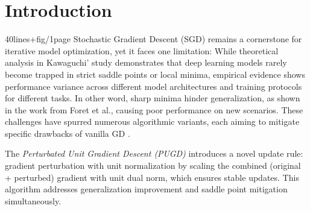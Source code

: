 \documentclass[10pt,twocolumn,letterpaper]{article}
\begin{document}
\section{Introduction} 40lines+fig/1page
Stochastic Gradient Descent (SGD) \cite{4308316} remains a cornerstone for iterative model optimization, yet it faces one limitation: While theoretical analysis in Kawaguchi' study \cite{kawaguchi2016deeplearningpoorlocal} demonstrates that deep learning models rarely become trapped in strict saddle points or local minima, empirical evidence shows performance variance across different model architectures and training protocols for different tasks. In other word, sharp minima hinder generalization, as shown in the work from Foret et al.\cite{foret2021sharpnessawareminimizationefficientlyimproving}, causing poor performance on new scenarios. These challenges have spurred numerous algorithmic variants, each aiming to mitigate specific drawbacks of vanilla GD \cite{ruder2017overviewgradientdescentoptimization}.

The \textit{Perturbated Unit Gradient Descent (PUGD)} \cite{Tseng_2022} introduces a novel update rule: gradient perturbation with unit normalization by scaling the combined (original + perturbed) gradient with unit dual norm, which ensures stable updates. This algorithm addresses generalization improvement and saddle point mitigation simultaneously.
\end{document}
